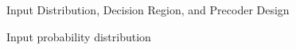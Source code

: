 \documentclass[journal]{IEEEtran}
\begin{document}
\begin{section}{Input Distribution, Decision Region, and Precoder Design}
\begin{subsection}{Input probability distribution}



\end{subsection}
\end{section}
\end{document}
